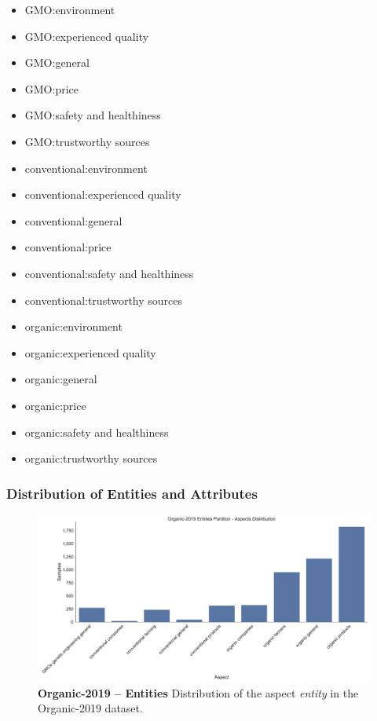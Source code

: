\begin{multicols}{2}
    \begin{itemize}[leftmargin=*]
        \setlength\itemsep{-0.5em}
        \item[] GMO:environment 
        \item[] GMO:experienced quality 
        \item[] GMO:general 
        \item[] GMO:price
        \item[] GMO:safety and healthiness
        \item[] GMO:trustworthy sources 
        \item[] conventional:environment 
        \item[] conventional:experienced quality 
        \item[] conventional:general 
        \item[] conventional:price
        \item[] conventional:safety and healthiness 
        \item[] conventional:trustworthy sources 
        \item[] organic:environment 
        \item[] organic:experienced quality 
        \item[] organic:general 
        \item[] organic:price
        \item[] organic:safety and healthiness
        \item[] organic:trustworthy sources
        \label{li:08_og_aspectsCoarse}  
    \end{itemize}
\end{multicols}

\subsubsection*{Distribution of Entities and Attributes}

\begin{figure}[H]
    \centering
    \includegraphics[width=\textwidth]{figures/05_setup/05_organicEntities}
    \caption{\textbf{Organic-2019 -- Entities} Distribution of the aspect \textit{entity} in the Organic-2019 dataset.}
    \label{fig:05_organic2019_Entities}
\end{figure}

